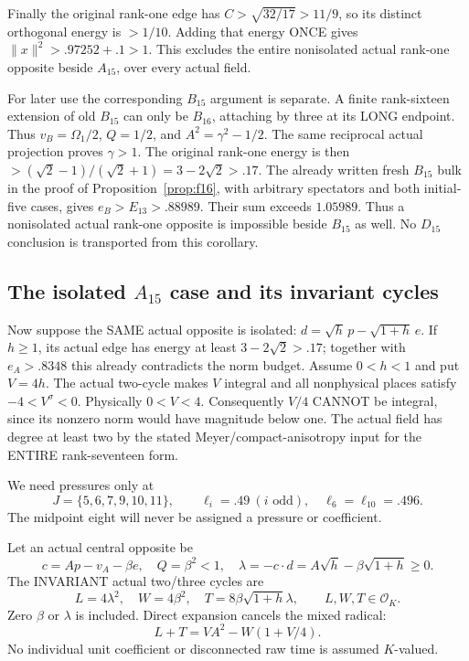 \documentclass[11pt]{article}
\begin{document}
Finally the original rank-one edge has
\(C>\sqrt{32/17}>11/9\), so its distinct orthogonal energy is
\(>1/10\).
Adding that energy ONCE gives
\(\|x\|^2>.97252+.1>1\).
This excludes the entire nonisolated actual rank-one opposite
beside \(A_{15}\), over every actual field.

For later use the corresponding \(B_{15}\) argument is separate.
A finite rank-sixteen extension of old \(B_{15}\) can only be
\(B_{16}\), attaching by three at its LONG endpoint.
Thus \(v_B=\Omega_1/2\), \(Q=1/2\), and
\(A^2=\gamma^2-1/2\).
The same reciprocal actual projection proves \(\gamma>1\).
The original rank-one energy is then
\(>(\sqrt2-1)/(\sqrt2+1)=3-2\sqrt2>.17\).
The already written fresh \(B_{15}\) bulk in the proof of
Proposition~\ref{prop:f16}, with arbitrary spectators and both
initial-five cases, gives \(e_B>E_{13}>.88989\).
Their sum exceeds \(1.05989\).
Thus a nonisolated actual rank-one opposite is impossible
beside \(B_{15}\) as well.  No \(D_{15}\) conclusion is
transported from this corollary.

\subsection{The isolated \(A_{15}\) case and its invariant cycles}
\label{app:arithA15isolatedcycles}

Now suppose the SAME actual opposite is isolated:
\(d=\sqrt h\,p-\sqrt{1+h}\,e\).
If \(h\ge1\), its actual edge has energy at least
\(3-2\sqrt2>.17\); together with \(e_A>.8348\) this
already contradicts the norm budget.
Assume \(0<h<1\) and put \(V=4h\).
The actual two-cycle makes \(V\) integral and all nonphysical
places satisfy \(-4<V^\sigma<0\).
Physically \(0<V<4\).
Consequently \(V/4\) CANNOT be integral, since its nonzero norm
would have magnitude below one.
The actual field has degree at least two by the stated
Meyer/compact-anisotropy input for the ENTIRE rank-seventeen form.

We need pressures only at
\[
 J=\{5,6,7,9,10,11\},\qquad
 \ell_i=.49\ (i\text{ odd}),\quad
 \ell_6=\ell_{10}=.496 .
\]
The midpoint eight will never be assigned a pressure or coefficient.

Let an actual central opposite be
\[
 c=Ap-v_A-\beta e,\quad Q=\beta^2<1,\quad
 \lambda=-c\cdot d=A\sqrt h-\beta\sqrt{1+h}\ge0.
\]
The INVARIANT actual two/three cycles are
\[
 L=4\lambda^2,\quad W=4\beta^2,\quad
T=8\beta\sqrt{1+h}\lambda,\qquad L,W,T\in\mathcal O_K .
\]
Zero \(\beta\) or \(\lambda\) is included.
Direct expansion cancels the mixed radical:
\[
                  L+T=VA^2-W(1+V/4).
\tag{Rankonecycle}\label{eq:arithrankonecycle}
\]
No individual unit coefficient or disconnected raw time is
assumed \(K\)-valued.
\end{document}
